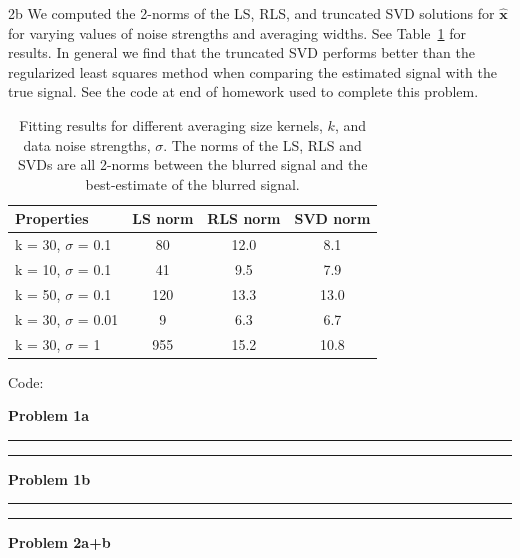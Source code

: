 \documentclass{article}
\begin{document}
\begin{homeworkProblem}
\begin{homeworkSection}{2b}
        We computed the 2-norms of the LS, RLS, and truncated SVD solutions for
        $\bm{\hat{x}}$ for varying values of noise strengths and averaging
        widths. See Table~\ref{table:1} for results. In general we find that
        the truncated SVD performs better than the regularized least squares
        method when comparing the estimated signal with the true signal. See
        the code at end of homework used to complete this problem.

        \begin{table}[H]

            \caption{\label{table:1} Fitting results for different averaging
            size kernels, $k$, and data noise strengths, $\sigma$. The norms of
        the LS, RLS and SVDs are all 2-norms between the blurred signal and the
    best-estimate of the blurred signal.}

            \begin{center}
                \begin{tabular}{lccc}

                    Properties & LS norm & RLS norm & SVD norm \\
                    \hline \hline
                    k = 30, $\sigma$ = 0.1 & 80 & 12.0 & 8.1 \\
                    k = 10, $\sigma$ = 0.1 & 41 & 9.5 & 7.9 \\
                    k = 50, $\sigma$ = 0.1 & 120 & 13.3 & 13.0 \\
                    k = 30, $\sigma$ = 0.01 & 9 & 6.3 & 6.7 \\
                    k = 30, $\sigma$ = 1 & 955 & 15.2 & 10.8 \\

                \end{tabular}
            \end{center}
        \end{table}

    \end{homeworkSection}
    
\end{homeworkProblem}
\clearpage

Code:

{\large \bf Problem 1a} \\
 
\hrule \hrule

{\large \bf Problem 1b} \\
 
\hrule \hrule

{\large \bf Problem 2a+b} \\

\end{document}
